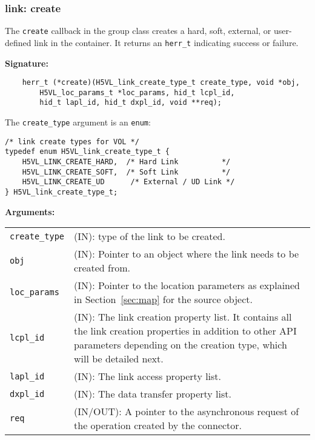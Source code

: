 \subsubsection{link: create}
The \texttt{create} callback in the group class creates a hard,
soft, external, or user-defined link in the container. It returns an
\texttt{herr\_t} indicating success or failure.\bigskip

\begin{mdframed}[style=bgbox]
\textbf{Signature:}
\begin{lstlisting}
    herr_t (*create)(H5VL_link_create_type_t create_type, void *obj,
        H5VL_loc_params_t *loc_params, hid_t lcpl_id, 
        hid_t lapl_id, hid_t dxpl_id, void **req);
\end{lstlisting}

The \texttt{create\_type} argument is an \texttt{enum}:
\begin{lstlisting}
/* link create types for VOL */
typedef enum H5VL_link_create_type_t {
    H5VL_LINK_CREATE_HARD,  /* Hard Link          */
    H5VL_LINK_CREATE_SOFT,  /* Soft Link          */
    H5VL_LINK_CREATE_UD      /* External / UD Link */
} H5VL_link_create_type_t;
\end{lstlisting}

\textbf{Arguments:}\\
\begin{tabular}{l p{13.5cm}}
  \texttt{create\_type} & (IN): type of the link to be created.\\
  \texttt{obj} & (IN): Pointer to an object where the link needs to be
  created from.\\
  \texttt{loc\_params} & (IN): Pointer to the location parameters as explained in
  Section~\ref{sec:map} for the source object. \\
  \texttt{lcpl\_id} & (IN): The link creation property list. It contains
  all the link creation properties in addition to other API parameters
  depending on the creation type, which will be detailed next.\\
  \texttt{lapl\_id} & (IN): The link access property list.\\
  \texttt{dxpl\_id} & (IN): The data transfer property list.\\
  \texttt{req} & (IN/OUT): A pointer to the asynchronous request of the
  operation created by the connector.\\
\end{tabular}
\end{mdframed}

